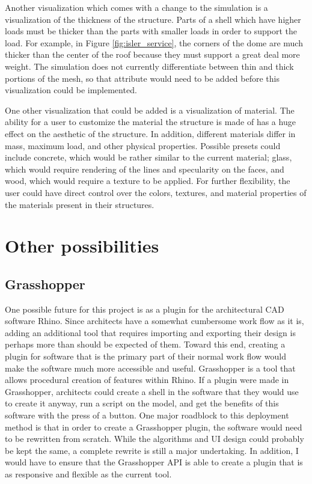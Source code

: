\documentclass{thesis}
\begin{document}
Another visualization which comes with a change to the simulation is a visualization of the thickness of the structure.  Parts
of a shell which have higher loads must be thicker than the parts with smaller loads in order to support the load.  For example,
in Figure \ref{fig:isler_service}, the corners of the dome are much thicker than the center of the roof because they must support
a great deal more weight.  The simulation does not currently differentiate between thin and thick portions of the mesh, so that
attribute would need to be added before this visualization could be implemented.

One other visualization that could be added is a visualization of material.  The ability for a user to customize the material the
structure is made of has a huge effect on the aesthetic of the structure.  In addition, different materials differ in mass,
maximum load, and other physical properties.  Possible presets could include concrete, which would be
rather similar to the current material; glass, which would require rendering of the lines and specularity on the faces, and wood,
which would require a texture to be applied.  For further flexibility, the user could have direct control over the colors, textures,
and material properties of the materials present in their structures.

\section{Other possibilities}

\subsection{Grasshopper}
One possible future for this project is as a plugin for the architectural CAD software Rhino\cite{rhino}.  Since architects
have a somewhat cumbersome work flow as it is, adding an additional tool that requires importing and exporting their design
is perhaps more than should be expected of them.  Toward this end, creating a plugin for software that is the primary part
of their normal work flow would make the software much more accessible and useful.  Grasshopper\cite{grasshopper} is a tool
that allows procedural creation of features within Rhino.  If a plugin were made in Grasshopper, architects could create a
shell in the software that they would use to create it anyway, run a script on the model, and get the benefits of this
software with the press of a button.  One major roadblock to this deployment method is that in order to create a Grasshopper
plugin, the software would need to be rewritten from scratch.  While the algorithms and UI design could probably be kept the
same, a complete rewrite is still a major undertaking.  In addition, I would have to ensure that the Grasshopper API is
able to create a plugin that is as responsive and flexible as the current tool.
\end{document}
